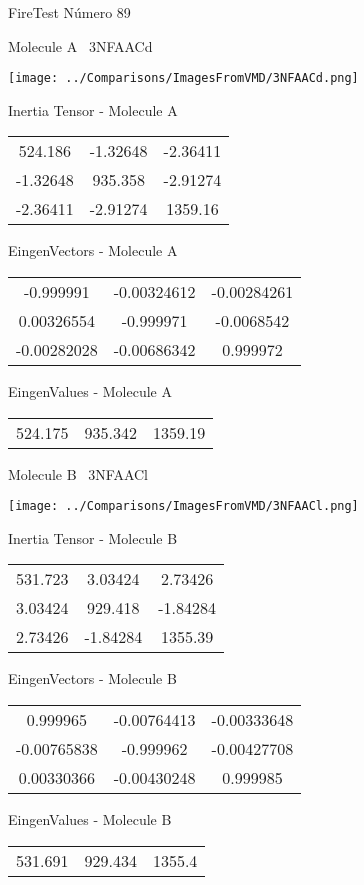 \vtab[-3cm]
\begin{center}
{\large FireTest \tab Número 89}
\end{center}
\begin{multicols}{2}
\begin{center}

Molecule A \
3NFAACd

\texttt{[image: ../Comparisons/ImagesFromVMD/3NFAACd.png]}

Inertia Tensor - Molecule A \\
\begin{tabular}{|c c c|}
524.186	 & 	-1.32648	 & 	-2.36411	 \\
-1.32648	 & 	935.358	 & 	-2.91274	 \\
-2.36411	 & 	-2.91274	 & 	1359.16
\end{tabular}

\vtab
 EingenVectors - Molecule A     \\
\begin{tabular}{|c c c|}
-0.999991	 & 	-0.00324612	 & 	-0.00284261	 \\
0.00326554	 & 	-0.999971	 & 	-0.0068542	 \\
-0.00282028	 & 	-0.00686342	 & 	0.999972
\end{tabular}

\vtab
 EingenValues - Molecule A     \\
\begin{tabular}{|c c c|}
524.175	 & 	935.342	 & 	1359.19	 \\
\end{tabular}
\columnbreak

Molecule B \
3NFAACl

\texttt{[image: ../Comparisons/ImagesFromVMD/3NFAACl.png]}

Inertia Tensor - Molecule B \\
\begin{tabular}{|c c c|}
531.723	 & 	3.03424	 & 	2.73426	 \\
3.03424	 & 	929.418	 & 	-1.84284	 \\
2.73426	 & 	-1.84284	 & 	1355.39
\end{tabular}

\vtab
 EingenVectors - Molecule B     \\
\begin{tabular}{|c c c|}
0.999965	 & 	-0.00764413	 & 	-0.00333648	 \\
-0.00765838	 & 	-0.999962	 & 	-0.00427708	 \\
0.00330366	 & 	-0.00430248	 & 	0.999985
\end{tabular}

\vtab
 EingenValues - Molecule B     \\
\begin{tabular}{|c c c|}
531.691	 & 	929.434	 & 	1355.4	 \\
\end{tabular}

\end{center}
\end{multicols}


